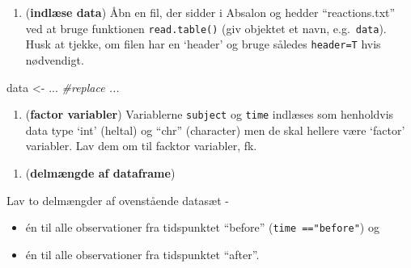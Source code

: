 \documentclass[
]{book}
\newenvironment{Shaded}{\begin{snugshade}}{\end{snugshade}}
\newcommand{\CommentTok}[1]{\textcolor[rgb]{0.56,0.35,0.01}{\textit{#1}}}
\newcommand{\DocumentationTok}[1]{\textcolor[rgb]{0.56,0.35,0.01}{\textbf{\textit{#1}}}}
\newcommand{\FunctionTok}[1]{\textcolor[rgb]{0.00,0.00,0.00}{#1}}
\newcommand{\NormalTok}[1]{#1}
\newcommand{\OtherTok}[1]{\textcolor[rgb]{0.56,0.35,0.01}{#1}}
\newcommand{\SpecialCharTok}[1]{\textcolor[rgb]{0.00,0.00,0.00}{#1}}
\providecommand{\tightlist}{%
  \setlength{\itemsep}{0pt}\setlength{\parskip}{0pt}}
\begin{document}
\begin{enumerate}
\def\labelenumi{\arabic{enumi})}
\setcounter{enumi}{7}
\tightlist
\item
  (\textbf{indlæse data}) Åbn en fil, der sidder i Absalon og hedder ``reactions.txt'' ved at bruge funktionen \texttt{read.table()} (giv objektet et navn, e.g.~\texttt{data}). Husk at tjekke, om filen har en `header' og bruge således \texttt{header=T} hvis nødvendigt.
\end{enumerate}

\begin{Shaded}
\begin{Highlighting}[]
\NormalTok{data }\OtherTok{\textless{}{-}}\NormalTok{ ... }\CommentTok{\#replace ...}
\end{Highlighting}
\end{Shaded}

\begin{enumerate}
\def\labelenumi{\arabic{enumi})}
\setcounter{enumi}{8}
\tightlist
\item
  (\textbf{factor variabler}) Variablerne \texttt{subject} og \texttt{time} indlæses som henholdvis data type `int' (heltal) og ``chr'' (character) men de skal hellere være `factor' variabler. Lav dem om til facktor variabler, fk.
\end{enumerate}

\begin{Shaded}
\end{Shaded}

\begin{enumerate}
\def\labelenumi{\arabic{enumi})}
\setcounter{enumi}{9}
\tightlist
\item
  (\textbf{delmængde af dataframe})
\end{enumerate}

Lav to delmængder af ovenstående datasæt -

\begin{itemize}
\tightlist
\item
  én til alle observationer fra tidspunktet ``before'' (\texttt{time\ =="before"}) og
\item
  én til alle observationer fra tidspunktet ``after''.
\end{itemize}
\end{document}
